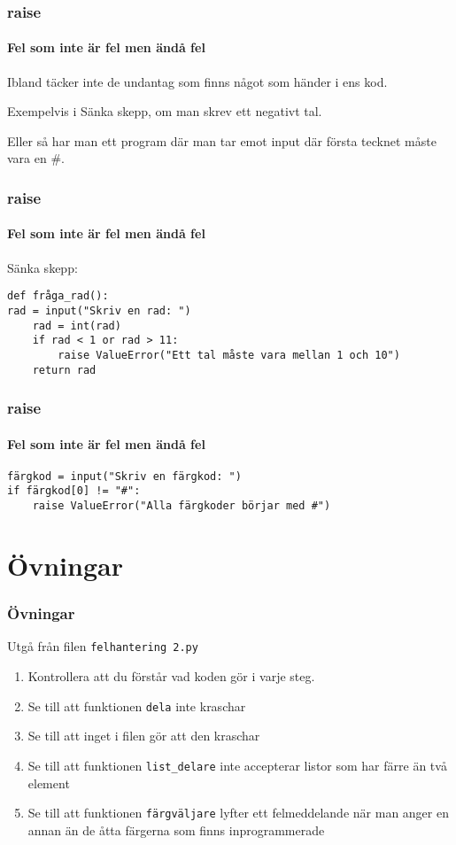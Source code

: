 \documentclass[aspectratio=169]{beamer}
\begin{document}
\begin{frame}
	\frametitle{raise}
	\framesubtitle{Fel som inte är fel men ändå fel}
	
	Ibland täcker inte de undantag som finns något som händer i ens kod.
	
	Exempelvis i Sänka skepp, om man skrev ett negativt tal.
	
	Eller så har man ett program där man tar emot input där första tecknet måste vara en \#.
	
\end{frame}


\begin{frame}[fragile]
	\frametitle{raise}
	\framesubtitle{Fel som inte är fel men ändå fel}

	Sänka skepp:
	
	\begin{lstlisting}
def fråga_rad():
rad = input("Skriv en rad: ")
    rad = int(rad)
    if rad < 1 or rad > 11:
        raise ValueError("Ett tal måste vara mellan 1 och 10")
    return rad
	\end{lstlisting}
	
\end{frame}

\begin{frame}[fragile]
	\frametitle{raise}
	\framesubtitle{Fel som inte är fel men ändå fel}
	
	\begin{lstlisting}
färgkod = input("Skriv en färgkod: ")
if färgkod[0] != "#":
    raise ValueError("Alla färgkoder börjar med #")
    \end{lstlisting}
	
\end{frame}

\section{Övningar}

\begin{frame}
\frametitle{Övningar}

Utgå från filen \texttt{felhantering 2.py}

\begin{enumerate}
	\item Kontrollera att du förstår vad koden gör i varje steg.
	\item Se till att funktionen \texttt{dela} inte kraschar
	\item Se till att inget i filen gör att den kraschar
	\item Se till att funktionen \texttt{list\_delare} inte accepterar listor som har färre än två element
	\item Se till att funktionen \texttt{färgväljare} lyfter ett felmeddelande när man anger en annan än de åtta färgerna som finns inprogrammerade
\end{enumerate}

\end{frame}
\end{document}
